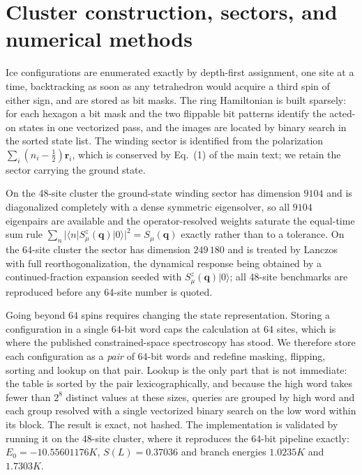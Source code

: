 \documentclass[aps,prl,twocolumn,amsmath,amssymb,superscriptaddress,
longbibliography,floatfix]{revtex4-2}
\newcommand{\bq}{\bm q}
\begin{document}
\section{Cluster construction, sectors, and numerical methods}
\label{sm:methods}

Ice configurations are enumerated exactly by depth-first assignment,
one site at a time, backtracking as soon as any tetrahedron would
acquire a third spin of either sign, and are stored as bit masks. The
ring Hamiltonian is built sparsely: for each hexagon a bit mask and the
two flippable bit patterns identify the acted-on states in one
vectorized pass, and the images are located by binary search in the
sorted state list. The winding sector is identified from the
polarization $\sum_i(n_i-\tfrac12)\bm r_i$, which is conserved by
Eq.~(1) of the main text; we retain the sector carrying the ground state.

On the 48-site cluster the ground-state winding sector has dimension
$9104$ and is diagonalized completely with a dense symmetric
eigensolver, so all $9104$ eigenpairs are available and the
operator-resolved weights saturate the equal-time sum rule
$\sum_n|\langle n|S^z_\mu(\bq)|0\rangle|^2=S_\mu(\bq)$ exactly rather
than to a tolerance. On the 64-site cluster the sector has dimension
$249\,180$ and is treated by Lanczos with full reorthogonalization,
the dynamical response being obtained by a continued-fraction
expansion seeded with $S^z_\mu(\bq)|0\rangle$; all 48-site benchmarks
are reproduced before any 64-site number is quoted.

Going beyond $64$ spins requires changing the state representation.
Storing a configuration in a single $64$-bit word caps the calculation
at $64$ sites, which is where the published constrained-space
spectroscopy has stood. We therefore store each configuration as a
\emph{pair} of $64$-bit words and redefine masking, flipping, sorting
and lookup on that pair. Lookup is the only part that is not
immediate: the table is sorted by the pair lexicographically, and
because the high word takes fewer than $2^8$ distinct values at these
sizes, queries are grouped by high word and each group resolved with a
single vectorized binary search on the low word within its block. The
result is exact, not hashed. The implementation is validated by
running it on the 48-site cluster, where it reproduces the 64-bit
pipeline exactly: $E_0=-10.55601176K$, $S(L)=0.37036$ and branch
energies $1.0235K$ and $1.7303K$.
\end{document}
